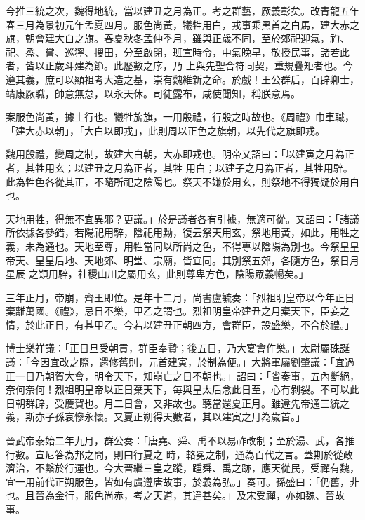 \begin{pinyinscope}
 今推三統之次，魏得地統，當以建丑之月為正。考之群藝，厥義彰矣。改青龍五年春三月為景初元年孟夏四月。服色尚黃，犧牲用白，戎事乘黑首之白馬，建大赤之旗，朝會建大白之旗。春夏秋冬孟仲季月，雖與正歲不同，至於郊祀迎氣，礿、祀、烝、嘗、巡獰、搜田，分至啟閉，班宣時令，中氣晚早，敬授民事，諸若此者，皆以正歲斗建為節。此歷數之序，乃
 上與先聖合符同契，重規疊矩者也。今遵其義，庶可以顯祖考大造之基，崇有魏維新之命。於戲！王公群后，百辟卿士，靖康厥職，帥意無怠，以永天休。司徒露布，咸使聞知，稱朕意焉。



 案服色尚黃，據土行也。犧牲旂旗，一用殷禮，行殷之時故也。《周禮》巾車職，「建大赤以朝」，「大白以即戎」，此則周以正色之旗朝，以先代之旗即戎。



 魏用殷禮，變周之制，故建大白朝，大赤即戎也。明帝又詔曰：「以建寅之月為正者，其牲用玄；以建丑之月為正者，其牲
 用白；以建子之月為正者，其牲用騂。此為牲色各從其正，不隨所祀之陰陽也。祭天不嫌於用玄，則祭地不得獨疑於用白也。



 天地用牲，得無不宜異邪？更議。」於是議者各有引據，無適可從。又詔曰：「諸議所依據各參錯，若陽祀用騂，陰祀用黝，復云祭天用玄，祭地用黃，如此，用牲之義，未為通也。天地至尊，用牲當同以所尚之色，不得專以陰陽為別也。今祭皇皇帝天、皇皇后地、天地郊、明堂、宗廟，皆宜同。其別祭五郊，各隨方色，祭日月星辰
 之類用騂，社稷山川之屬用玄，此則尊卑方色，陰陽眾義暢矣。」



 三年正月，帝崩，齊王即位。是年十二月，尚書盧毓奏：「烈祖明皇帝以今年正日棄離萬國。《禮》，忌日不樂，甲乙之謂也。烈祖明皇帝建丑之月棄天下，臣妾之情，於此正日，有甚甲乙。今若以建丑正朝四方，會群臣，設盛樂，不合於禮。」



 博士樂祥議：「正日旦受朝貢，群臣奉贄；後五日，乃大宴會作樂。」太尉屬硃誕議：「今因宜改之際，還修舊則，元首建寅，於制為便。」大將軍屬劉肇議：「宜過
 正一日乃朝賀大會，明令天下，知崩亡之日不朝也。」詔曰：「省奏事，五內斷絕，奈何奈何！烈祖明皇帝以正日棄天下，每與皇太后念此日至，心有剝裂。不可以此日朝群辟，受慶賀也。月二日會，又非故也。聽當還夏正月。雖違先帝通三統之義，斯亦子孫哀慘永懷。又夏正朔得天數者，其以建寅之月為歲首。」



 晉武帝泰始二年九月，群公奏：「唐堯、舜、禹不以易祚改制；至於湯、武，各推行數。宣尼答為邦之問，則曰行夏之
 時，輅冕之制，通為百代之言。蓋期於從政濟治，不繫於行運也。今大晉繼三皇之蹤，踵舜、禹之跡，應天從民，受禪有魏，宜一用前代正朔服色，皆如有虞遵唐故事，於義為弘。」奏可。孫盛曰：「仍舊，非也。且晉為金行，服色尚赤，考之天道，其違甚矣。」及宋受禪，亦如魏、晉故事。




\end{pinyinscope}
